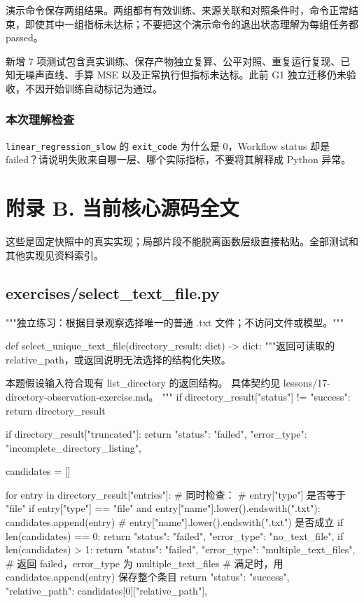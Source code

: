 演示命令保存两组结果。两组都有有效训练、来源关联和对照条件时，命令正常结束，即使其中一组指标未达标；不要把这个演示命令的退出状态理解为每组任务都 passed。

新增 7 项测试包含真实训练、保存产物独立复算、公平对照、重复运行复现、已知无噪声直线、手算 MSE 以及正常执行但指标未达标。此前 G1 独立迁移仍未验收，不因开始训练自动标记为通过。

\subsubsection{本次理解检查}

\nolinkurl{linear_regression_slow} 的 \nolinkurl{exit_code} 为什么是 0，Workflow status 却是 failed？请说明失败来自哪一层、哪个实际指标，不要将其解释成 Python 异常。

\section{附录 B. 当前核心源码全文}
这些是固定快照中的真实实现；局部片段不能脱离函数层级直接粘贴。全部测试和其他实现见资料索引。

\subsection{exercises/select\_text\_file.py}

\begin{Code}
"""独立练习：根据目录观察选择唯一的普通 .txt 文件；不访问文件或模型。"""


def select_unique_text_file(directory_result: dict) -> dict:
    """返回可读取的 relative_path，或返回说明无法选择的结构化失败。

    本题假设输入符合现有 list_directory 的返回结构。
    具体契约见 lessons/17-directory-observation-exercise.md。
    """
    if directory_result["status"] != "success":
        return directory_result

    if directory_result["truncated"]:
        return {
        "status": "failed",
        "error_type": "incomplete_directory_listing",
    }

    candidates = []

    for entry in directory_result["entries"]:
    # 同时检查：
    # entry["type"] 是否等于 "file"
        if entry["type"] == "file" and entry["name"].lower().endswith(".txt"):
            candidates.append(entry)
    # entry["name"].lower().endswith(".txt") 是否成立
    if len(candidates) == 0:
        return {
        "status": "failed",
        "error_type": "no_text_file",
    }
    if len(candidates) > 1:
        return{
                "status": "failed", 
                "error_type": "multiple_text_files",
            }
    # 返回 failed，error_type 为 multiple_text_files
    # 满足时，用 candidates.append(entry) 保存整个条目
    return {
    "status": "success",
    "relative_path": candidates[0]["relative_path"],
}
\end{Code}

